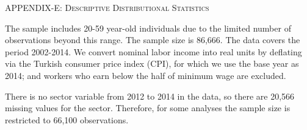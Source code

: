 \documentclass[12pt,author-year]{article}
\begin{document}
\pagebreak

\begin{center}
	\label{AppendixE}
	\textsc{\large{APPENDIX-E: Descriptive Distributional Statistics}}
\end{center}

The sample includes 20-59 year-old individuals due to the limited number of observations beyond this range. The sample size is 86,666. The data covers the period 2002-2014. We convert nominal labor income into real units by deflating via the Turkish consumer price index (CPI), for which we use the base year as 2014; and workers who earn below the half of minimum wage are excluded.

There is no sector variable from 2012 to 2014 in the data, so there are 20,566 missing values for the sector. Therefore, for some analyses the sample size is restricted to 66,100 observations.

\renewcommand{\thetable}{E\arabic{table}} 
\setcounter{table}{0}  
\end{document}

